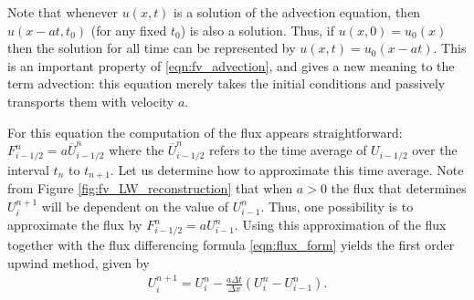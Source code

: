 Note that whenever $u(x,t)$ is a solution of the advection equation, then $u(x-at,t_0)$ (for any fixed $t_0$) is also a solution.
Thus, if $u(x,0) = u_0(x)$ then the solution for all time can be represented by $u(x,t) = u_0(x-at)$.
This is an important property of \eqref{eqn:fv_advection}, and gives a new meaning to the term advection: this equation merely takes the initial conditions and passively transports them with velocity $a$.

For this equation the computation of the flux appears straightforward: $F_{i-1/2}^n = a\overline{U}^n_{i-1/2}$ where the $\overline{U}^n_{i-1/2}$ refers to the time average of $U_{i-1/2}$ over the interval $t_n$ to $t_{n+1}$.
Let us determine how to approximate this time average.
Note from Figure \ref{fig:fv_LW_reconstruction} that when $a>0$ the flux that determines $U_i^{n+1}$ will be dependent on the value of $U_{i-1}^n$. Thus, one possibility is to approximate the flux by $F_{i-1/2}^n = aU_{i-1}^n$.
Using this approximation of the flux together with the flux differencing formula \eqref{eqn:flux_form} yields the first order upwind method, given by
\begin{align*}
U_i^{n+1} = U_i^n - \frac{a\Delta t}{\Delta x}\left(U_i^n-U_{i-1}^n\right).
\end{align*}
